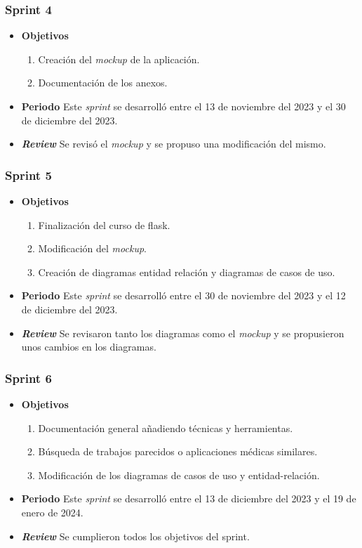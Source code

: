 \subsubsection{Sprint 4}
\begin{itemize}
\item \textbf{Objetivos}
\begin{enumerate}
\item Creación del \textit{mockup} de la aplicación.
\item Documentación de los anexos.
\end{enumerate}
\item \textbf{Periodo}
Este \textsl{sprint} se desarrolló entre el 13 de noviembre del 2023 y el 30 de diciembre del 2023.
\item \textbf{\textsl{Review}}
Se revisó el \textit{mockup} y se propuso una modificación del mismo. 


\end{itemize}


\subsubsection{Sprint 5}
\begin{itemize}
\item \textbf{Objetivos}
\begin{enumerate}
\item Finalización del curso de flask.
\item Modificación del \textit{mockup}.
\item Creación de diagramas entidad relación y diagramas de casos de uso.
\end{enumerate}
\item \textbf{Periodo}
Este \textsl{sprint} se desarrolló entre el 30 de noviembre del 2023 y el 12 de diciembre del 2023.
\item \textbf{\textsl{Review}}
Se revisaron tanto los diagramas como el \textit{mockup} y se propusieron unos cambios en los diagramas. 


\end{itemize}

\subsubsection{Sprint 6}
\begin{itemize}
\item \textbf{Objetivos}
\begin{enumerate}
\item Documentación general añadiendo técnicas y herramientas.
\item Búsqueda de trabajos parecidos o aplicaciones médicas similares.
\item Modificación de los diagramas de casos de uso y entidad-relación.
\end{enumerate}
\item \textbf{Periodo}
Este \textsl{sprint} se desarrolló entre el 13 de diciembre del 2023 y el 19 de enero de 2024.
\item \textbf{\textsl{Review}}
Se cumplieron todos los objetivos del sprint. 


\end{itemize}
